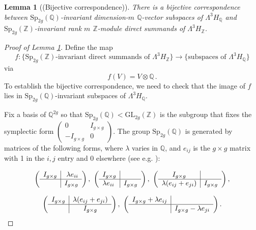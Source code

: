 \documentclass[a4paper]{amsproc}
\theoremstyle{TheoremNum}
\theoremstyle{Theorembold}
\newtheorem{lem}[thm]{Lemma}
\theoremstyle{TheoremboldDef}
\theoremstyle{TheoremboldRem}
\theoremstyle{TheoremboldRem}
\begin{document}
\begin{lem}[(Bijective correspondence)]\label{spirrep} 
There is a bijective correspondence between ${\text{Sp}_{2g}({\mathbb{Q}})}$-invariant dimension-$m$ ${\mathbb{Q}}$-vector subspaces of $\Lambda^3H_{\mathbb{Q}}$ and ${\text{Sp}_{2g}({\mathbb{Z}})}$-invariant rank $m$ ${\mathbb{Z}}$-module direct summands of $\Lambda^3H_{\mathbb{Z}}$.
\end{lem}

\begin{proof}[Proof of Lemma \ref{spirrep}] 
Define the map \[f: \{{\text{Sp}_{2g}({\mathbb{Z}})}\text{-invariant direct summands of }\Lambda^3H_{\mathbb{Z}}\}\to \{\text{subspaces of }\Lambda^3H_{\mathbb{Q}}\}\] via \[f(V)= V\otimes {\mathbb{Q}} \,.\] To establish the bijective correspondence, we need to check that the image of $f$ lies in ${\text{Sp}_{2g}({\mathbb{Q}})}$-invariant subspaces of $\Lambda^3H_{\mathbb{Q}}$. 

Fix a basis of ${\mathbb{Q}}^{2g}$ so that ${\text{Sp}_{2g}({\mathbb{Q}})}<{\text{GL}_{2g}({\mathbb{Z}})}$ is the subgroup that fixes the symplectic form $\left(\begin{array}{c|c}
0 & I_{g\times g}\\
\hline
-I_{g\times g}& 0
\end{array}\right)$. The group ${\text{Sp}_{2g}({\mathbb{Q}})}$ is generated by matrices of the following forms, where $\lambda$ varies in ${\mathbb{Q}}$, and $e_{ij}$ is the $g\times g$ matrix with 1 in the $i,j$ entry and $0$ elsewhere (see e.g. \cite[Sect.2.2]{Spgen}):

\begin{equation}\label{spgen}
\left(\begin{array}{l|r}
I_{g\times g}& \lambda e_{ii}\\
\hline
& I_{g\times g}
\end{array}\right),\,\, \left(\begin{array}{l|r}
I_{g\times g}& \\
\hline
\lambda e_{ii} & I_{g\times g}
\end{array}\right),\,\, \left(\begin{array}{c|c}
I_{g\times g}& \\
\hline
\lambda( e_{ij}+e_{ji}) & I_{g\times g}
\end{array}\right), 
\end{equation}

\begin{equation*} 
\left(\begin{array}{c|c}
I_{g\times g}& \lambda( e_{ij}+e_{ji})\\
\hline
 & I_{g\times g}
\end{array}\right),\,\, \left(\begin{array}{l|r}
I_{g\times g} +\lambda e_{ij}\\
\hline
 & I_{g\times g}-\lambda e_{ji}
\end{array}\right).\end{equation*}


\end{proof}
\end{document}
